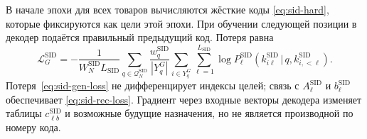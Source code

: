 \documentclass[12pt,a4paper]{article}
\newcommand{\given}{\,\vert\,}
\theoremstyle{plainru}
\begin{document}
В начале эпохи для всех товаров вычисляются жёсткие коды
\eqref{eq:sid-hard}, которые фиксируются как цели этой эпохи.
При обучении следующей позиции в декодер подаётся правильный
предыдущий код. Потеря равна
\begin{equation}\label{eq:sid-gen-loss}
 \mathcal L_G^{\mathrm{SID}}
 =-\frac{1}{W_N^{\mathrm{SID}}L_{\mathrm{SID}}}
 \sum_{q\in\mathcal Q_N^{\mathrm{SID}}}
 \frac{w_q^{\mathrm{SID}}}{|Y_q^G|}
 \sum_{i\in Y_q^G}\sum_{\ell=1}^{L_{\mathrm{SID}}}
 \log P_\ell^{\mathrm{SID}}
       (k_{i\ell}^{\mathrm{SID}}\given q,k_{i,<\ell}^{\mathrm{SID}}).
\end{equation}
Потеря~\eqref{eq:sid-gen-loss} не дифференцирует индексы целей;
связь с $A_\ell^{\mathrm{SID}}$ и $b_\ell^{\mathrm{SID}}$ обеспечивает
\eqref{eq:sid-rec-loss}. Градиент через входные векторы декодера
изменяет таблицы $c_{\ell b}^{\mathrm{SID}}$ и возможные будущие назначения,
но не является производной по номеру кода.
\end{document}
